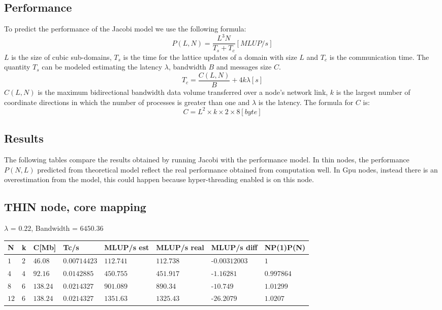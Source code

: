 \documentclass[11pt,a4paper]{article}
\begin{document}
\subsection{Performance}
To predict the performance of the Jacobi model we use the following formula:
\begin{equation}
P(L,N)=\dfrac{L^3 N}{T_s + T_c}[MLUP/s]
\end{equation}
$L$ is the size of cubic sub-domains, $T_s$ is the time for the lattice updates of a domain with size $L$ and $T_c$ is the communication time. The quantity $T_s$ can be modeled estimating the latency $\lambda$, bandwidth $B$ and messages size $C$.
\begin{equation}
T_c = \dfrac{C(L,N)}{B}+4k\lambda[s]
\end{equation}
$C(L,N)$ is the maximum bidirectional bandwidth data volume transferred over a node's network link, $k$ is the largest number of coordinate directions in which the number of processes is greater than one and $\lambda$ is the latency. The formula for $C$ is:
\begin{equation}
C = L^2 \times k \times 2 \times 8[byte]
\end{equation}
\subsection{Results}
The following tables compare the results obtained by running Jacobi with the performance model. In thin nodes, the performance $P(N,L)$ predicted from theoretical model reflect the real performance obtained from computation well. In Gpu nodes, instead there is an overestimation from the model, this could happen because hyper-threading enabled is on this node.
\subsection*{THIN node, core mapping}
$\lambda$ = $0.22$, Bandwidth = $6450.36$
\begin{table}[H]
    \centering
    \begin{tabular}{|l|l|l|l|l|l|l|l|}
    \toprule
    N 		& k 	& C[Mb] 	& Tc/s 			& MLUP/s est 	& MLUP/s real 	& MLUP/s diff  & NP(1)P(N) \\
    \midrule
    $1$ 	& $2$ 	& $46.08$ 	& $0.00714423$ 	& $112.741$ 	& $112.738$ 	&-$0.00312003$ & $1$ \\
    $4$ 	& $4$ 	& $92.16$ 	& $0.0142885$ 	& $450.755$ 	& $451.917$ 	&-$1.16281$ & $0.997864$ \\
    $8$ 	& $6$ 	& $138.24$ 	& $0.0214327$ 	& $901.089$ 	& $890.34$ 		&-$10.749$ & $1.01299$ \\
    $12$ 	& $6$ 	& $138.24$ 	& $0.0214327$ 	& $1351.63$ 	& $1325.43$ 	&-$26.2079$ & $1.0207$ \\
    \bottomrule
    \end{tabular}
\end{table}
\end{document}
